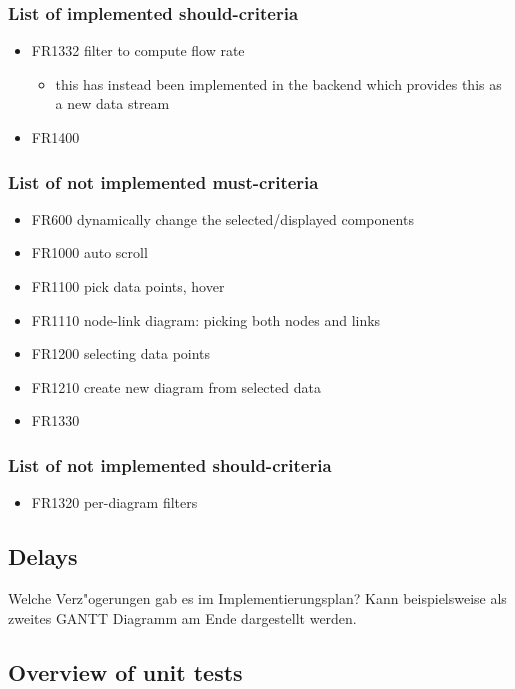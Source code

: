 \documentclass[oneside, english, final]{design}
\begin{document}
\subsubsection{List of implemented should-criteria}
\begin{itemize}
  \item{FR1332 filter to compute flow rate}
  \begin{itemize}
    \item{this has instead been implemented in the backend which provides this as a new data stream}
  \end{itemize}
  \item{FR1400}
\end{itemize}

\subsubsection{List of not implemented must-criteria}
\begin{itemize}
  \item{FR600 dynamically change the selected/displayed components}
  \item{FR1000 auto scroll}
  \item{FR1100 pick data points, hover}
  \item{FR1110 node-link diagram: picking both nodes and links}
  \item{FR1200 selecting data points}
  \item{FR1210 create new diagram from selected data}
  \item{FR1330}
\end{itemize}


\subsubsection{List of not implemented should-criteria}
\begin{itemize}
\item{FR1320 per-diagram filters}
\end{itemize}


\subsection{Delays}
Welche Verz"ogerungen gab es im Implementierungsplan? Kann beispielsweise als zweites
GANTT Diagramm am Ende dargestellt werden.
\subsection{Overview of unit tests}
\end{document}
